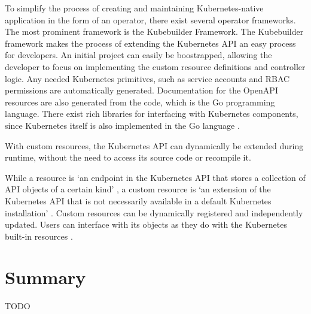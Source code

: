 To simplify the process of creating and maintaining Kubernetes-native application
in the form of an operator,
there exist several operator frameworks.
The most prominent framework is the Kubebuilder Framework.
The Kubebuilder framework makes the process of extending the Kubernetes API
an easy process for developers.
An initial project can easily be boostrapped, allowing the developer to focus
on implementing the custom resource definitions and controller logic.
Any needed Kubernetes primitives, such as service accounts and RBAC permissions
are automatically generated.
Documentation for the OpenAPI resources are also generated from the code,
which is the Go programming language.
There exist rich libraries for interfacing with Kubernetes components,
since Kubernetes itself is also implemented in the Go language
\autocite{kubebuilderBookWebsite}.

With custom resources, the Kubernetes API can dynamically be extended during runtime,
without the need to access its source code or recompile it.

While a resource is
\enquote*{an endpoint in the Kubernetes API that stores a collection of API objects of a certain kind}
\autocite{customResourcesKubernetesIO},
a custom resource is
\enquote*{an extension of the Kubernetes API that is not necessarily available in a default Kubernetes installation}
\autocite{customResourcesKubernetesIO}.
Custom resources can be dynamically registered and independently updated.
Users can interface with its objects as they do with the Kubernetes built-in resources
\autocite{customResourcesKubernetesIO}.

\section{Summary}

TODO































